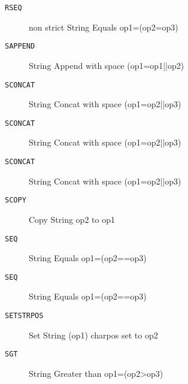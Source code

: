 \begin{description}
\item[\texttt{RSEQ}]  non strict String Equals op1=(op2=op3)\\

\end{description}
\begin{description}
\item[\texttt{SAPPEND}]  String Append with space (op1=op1||op2)\\

\end{description}
\begin{description}
\item[\texttt{SCONCAT}]  String Concat with space (op1=op2||op3)\\

\end{description}
\begin{description}
\item[\texttt{SCONCAT}]  String Concat with space (op1=op2||op3)\\

\end{description}
\begin{description}
\item[\texttt{SCONCAT}]  String Concat with space (op1=op2||op3)\\

\end{description}
\begin{description}
\item[\texttt{SCOPY}]  Copy String op2 to op1\\

\end{description}
\begin{description}
\item[\texttt{SEQ}]  String Equals op1=(op2==op3)\\

\end{description}
\begin{description}
\item[\texttt{SEQ}]  String Equals op1=(op2==op3)\\

\end{description}
\begin{description}
\item[\texttt{SETSTRPOS}]  Set String (op1) charpos set to op2\\

\end{description}
\begin{description}
\item[\texttt{SGT}]  String Greater than op1=(op2>op3)\\

\end{description}
